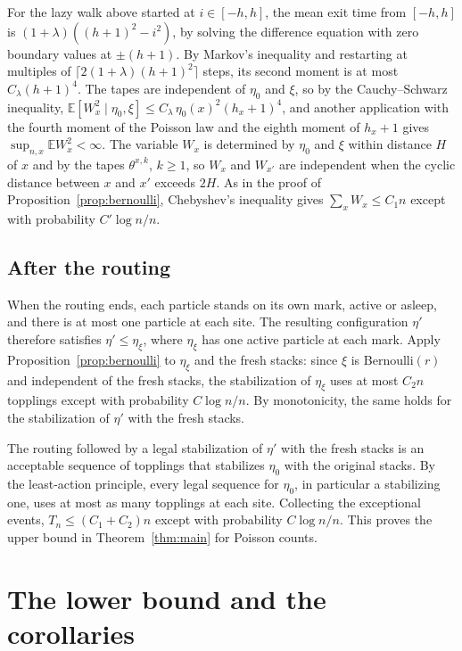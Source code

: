 \documentclass[11pt]{amsart}
\theoremstyle{remark}
\newcommand{\E}{\mathbb E}
\begin{document}
For the lazy walk above started at $i\in[-h,h]$, the mean exit time from $[-h,h]$ is $(1+\lambda)((h+1)^2-i^2)$, by
solving the difference equation with zero boundary values at $\pm(h+1)$. By Markov's inequality and restarting at
multiples of $\lceil2(1+\lambda)(h+1)^2\rceil$ steps, its second moment is at most $C_\lambda(h+1)^4$. The tapes are
independent of $\eta_0$ and $\xi$, so by the Cauchy--Schwarz inequality,
$\E[W_x^2\mid\eta_0,\xi]\le C_\lambda\,\eta_0(x)^2(h_x+1)^4$, and another application with the fourth moment of the
Poisson law and the eighth moment of $h_x+1$ gives $\sup_{n,x}\E W_x^2<\infty$. The variable $W_x$ is determined by $\eta_0$
and $\xi$ within distance $H$ of $x$ and by the tapes $\theta^{x,k}$, $k\ge1$, so $W_x$ and $W_{x'}$ are
independent when the cyclic distance between $x$ and $x'$ exceeds $2H$. As in the proof of
Proposition~\ref{prop:bernoulli}, Chebyshev's inequality gives $\sum_xW_x\le C_1n$ except with probability
$C'\log n/n$.

\subsection*{After the routing}
When the routing ends, each particle stands on its own mark, active or asleep, and there is at most one particle at
each site. The resulting configuration $\eta'$ therefore satisfies $\eta'\le\eta_\xi$, where $\eta_\xi$ has one active
particle at each mark. Apply Proposition~\ref{prop:bernoulli} to $\eta_\xi$ and the fresh stacks: since $\xi$ is
Bernoulli$(r)$ and independent of the fresh stacks, the stabilization of $\eta_\xi$ uses at most $C_2n$ topplings except
with probability $C\log n/n$. By monotonicity, the same holds for the stabilization of $\eta'$ with the fresh stacks.

The routing followed by a legal stabilization of $\eta'$ with the fresh stacks is an acceptable sequence of topplings
that stabilizes $\eta_0$ with the original stacks. By the least-action principle, every legal sequence for $\eta_0$, in
particular a stabilizing one, uses at most as many topplings at each site. Collecting the exceptional events,
$T_n\le(C_1+C_2)n$ except with probability $C\log n/n$. This proves the upper bound in Theorem~\ref{thm:main} for Poisson
counts.

\section{The lower bound and the corollaries}\label{sec:lower}
\end{document}
